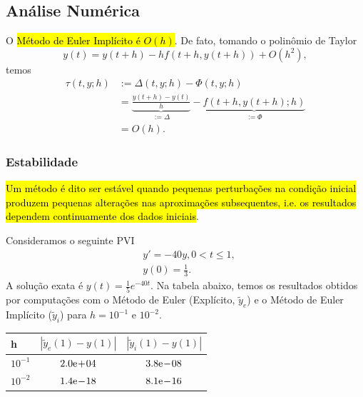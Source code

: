 \subsection{Análise Numérica}

O \hl{Método de Euler Implícito é $O(h)$}. De fato, tomando o polinômio de Taylor
\begin{equation}
  y(t) = y(t+h) -hf\left(t+h, y(t+h)\right) + O(h^2),
\end{equation}
temos
\begin{align}
  \tau(t, y; h) &:= \Delta(t,y; h) - \Phi(t, y; h) \\
                &= \underbrace{\frac{y(t+h) - y(t)}{h}}_{:= \Delta} - \underbrace{f(t+h, y(t+h); h)}_{:= \Phi}\\
                &= O(h).
\end{align}

\subsubsection{Estabilidade}

\hl{Um método é dito ser estável quando pequenas perturbações na condição inicial produzem pequenas alterações nas aproximações subsequentes, i.e. os resultados dependem continuamente dos dados iniciais}.

\begin{ex}
  Consideramos o seguinte PVI
  \begin{subequations}
    \begin{align}
      &y' = -40y, 0 < t \leq 1,\\
      &y(0) = \frac{1}{3}.
    \end{align}
  \end{subequations}
  A solução exata é $y(t) = \frac{1}{5}e^{-40t}$. Na tabela abaixo, temos os resultados obtidos por computações com o Método de Euler (Explícito, $\tilde{y}_e$) e o Método de Euler Implícito ($\tilde{y}_i$) para $h = 10^{-1}$ e $10^{-2}$.

  \begin{center}
    \begin{tabular}{lcc}
      h & $\left|\tilde{y}_e(1) - y(1)\right|$ & $\left|\tilde{y}_i(1) - y(1)\right|$ \\\hline
      $10^{-1}$ & $2.0\mathrm{e}\!+\!04$ & $3.8\mathrm{e}\!-\!08$ \\
      $10^{-2}$ & $1.4\mathrm{e}\!-\!18$ & $8.1\mathrm{e}\!-\!16$ \\\hline
    \end{tabular}
  \end{center}
\end{ex}

